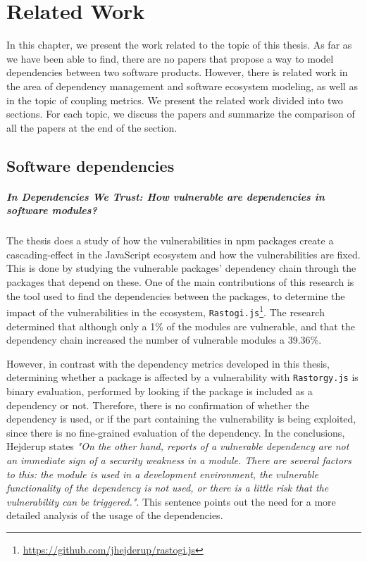 \chapter{Related Work}\label{ch:RelatedWork}
In this chapter, we present the work related to the topic of this thesis.
As far as we have been able to find, there are no papers that propose a way to model dependencies between two software products. However, there is related work in the area of dependency management and software ecosystem modeling, as well as in the topic of coupling metrics. We present the related work divided into two sections. For each topic, we discuss the papers and summarize the comparison of all the papers at the end of the section.

\section{Software dependencies}

\paragraph{In Dependencies We Trust: How vulnerable are dependencies in software modules? \cite{hejderup2015dependencies}}
The thesis does a study of how the vulnerabilities in npm packages create a cascading-effect in the JavaScript ecosystem and how the vulnerabilities are fixed. This is done by studying the vulnerable packages' dependency chain through the packages that depend on these. One of the main contributions of this research is the tool used to find the dependencies between the packages, to determine the impact of the vulnerabilities in the ecosystem, \texttt{Rastogi.js}\footnote{\href{https://github.com/jhejderup/rastogi.js}{https://github.com/jhejderup/rastogi.js}}. The research determined that although only a 1\% of the modules are vulnerable, and that the dependency chain increased the number of vulnerable modules a 39.36\%.

However, in contrast with the dependency metrics developed in this thesis, determining whether a package is affected by a vulnerability with \texttt{Rastorgy.js} is binary evaluation, performed by looking if the package is included as a dependency or not. Therefore, there is no confirmation of whether the dependency is used, or if the part containing the vulnerability is being exploited, since there is no fine-grained evaluation of the dependency. In the conclusions, Hejderup states \textit{"On the other hand, reports of a vulnerable dependency are not an immediate sign of a security weakness in a module. There are several factors to this: the module is used in a development environment, the vulnerable functionality of the dependency is not used, or there is a little risk that the vulnerability can be triggered."}. This sentence points out the need for a more detailed analysis of the usage of the dependencies.

